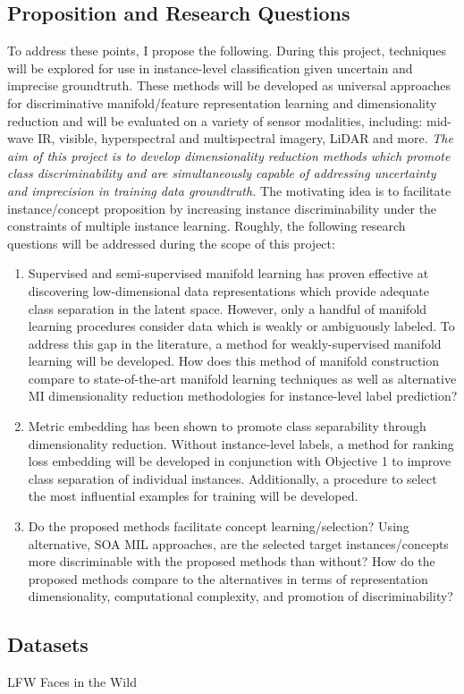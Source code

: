\subsection{Proposition and Research Questions}
To address these points, I propose the following.  During this project, techniques will be explored for use in instance-level classification given uncertain and imprecise groundtruth.  These methods will be developed as universal approaches for discriminative manifold/feature representation learning and dimensionality reduction and will be evaluated on a variety of sensor modalities, including: mid-wave IR, visible, hyperspectral and multispectral imagery, LiDAR and more.  \textit{The aim of this project is to develop dimensionality reduction methods which promote class discriminability and are simultaneously capable of addressing uncertainty and imprecision in training data groundtruth.}  The motivating idea is to facilitate instance/concept proposition by increasing instance discriminability under the constraints of multiple instance learning. Roughly, the following research questions will be addressed during the scope of this project:
\begin{enumerate}
	\item Supervised and semi-supervised manifold learning has proven effective at discovering low-dimensional data representations which provide adequate class separation in the latent space.  However, only a handful of manifold learning procedures consider data which is weakly or ambiguously labeled.  To address this gap in the literature, a method for weakly-supervised manifold learning will be developed. How does this method of manifold construction compare to state-of-the-art manifold learning techniques as well as alternative MI dimensionality reduction methodologies for instance-level label prediction?
	\item Metric embedding has been shown to promote class separability through dimensionality reduction.  Without instance-level labels, a method for ranking loss embedding will be developed in conjunction with Objective 1 to improve class separation of individual instances.  Additionally, a procedure to select the most influential examples for training will be developed.
	\item Do the proposed methods facilitate concept learning/selection?  Using alternative, SOA MIL approaches, are the selected target instances/concepts more discriminable with the proposed methods than without?  How do the proposed methods compare to the alternatives in terms of representation dimensionality, computational complexity, and promotion of discriminability?
\end{enumerate} 

\subsection{Datasets}
LFW Faces in the Wild

